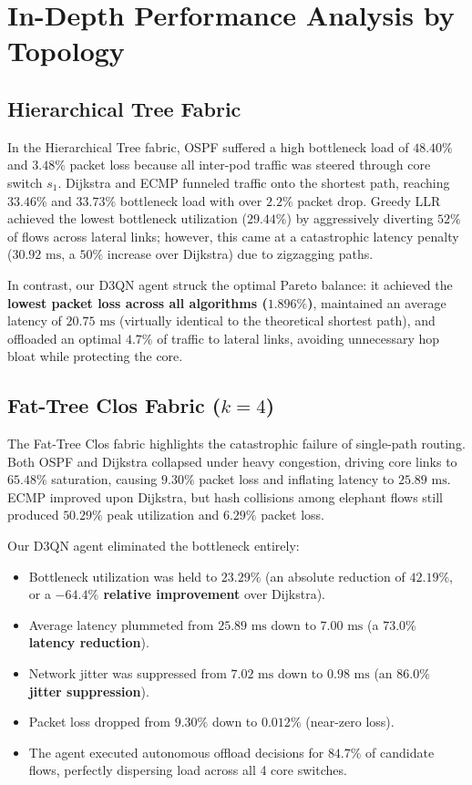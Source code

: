 \documentclass[12pt,a4paper,oneside]{report}
\begin{document}
\section{In-Depth Performance Analysis by Topology}

\subsection{Hierarchical Tree Fabric}
In the Hierarchical Tree fabric, OSPF suffered a high bottleneck load of $48.40\%$ and $3.48\%$ packet loss because all inter-pod traffic was steered through core switch $s_1$. Dijkstra and ECMP funneled traffic onto the shortest path, reaching $33.46\%$ and $33.73\%$ bottleneck load with over $2.2\%$ packet drop. Greedy LLR achieved the lowest bottleneck utilization ($29.44\%$) by aggressively diverting $52\%$ of flows across lateral links; however, this came at a catastrophic latency penalty ($30.92\text{ ms}$, a $50\%$ increase over Dijkstra) due to zigzagging paths.

In contrast, our D3QN agent struck the optimal Pareto balance: it achieved the \textbf{lowest packet loss across all algorithms ($1.896\%$)}, maintained an average latency of \textbf{$20.75\text{ ms}$} (virtually identical to the theoretical shortest path), and offloaded an optimal $4.7\%$ of traffic to lateral links, avoiding unnecessary hop bloat while protecting the core.

\subsection{Fat-Tree Clos Fabric ($k=4$)}
The Fat-Tree Clos fabric highlights the catastrophic failure of single-path routing. Both OSPF and Dijkstra collapsed under heavy congestion, driving core links to $65.48\%$ saturation, causing $9.30\%$ packet loss and inflating latency to $25.89\text{ ms}$. ECMP improved upon Dijkstra, but hash collisions among elephant flows still produced $50.29\%$ peak utilization and $6.29\%$ packet loss.

Our D3QN agent eliminated the bottleneck entirely:
\begin{itemize}
    \item Bottleneck utilization was held to \textbf{$23.29\%$} (an absolute reduction of \textbf{$42.19\%$}, or a \textbf{$-64.4\%$ relative improvement} over Dijkstra).
    \item Average latency plummeted from $25.89\text{ ms}$ down to \textbf{$7.00\text{ ms}$} (a \textbf{$73.0\%$ latency reduction}).
    \item Network jitter was suppressed from $7.02\text{ ms}$ down to \textbf{$0.98\text{ ms}$} (an \textbf{$86.0\%$ jitter suppression}).
    \item Packet loss dropped from $9.30\%$ down to \textbf{$0.012\%$} (near-zero loss).
    \item The agent executed autonomous offload decisions for \textbf{$84.7\%$} of candidate flows, perfectly dispersing load across all 4 core switches.
\end{itemize}
\end{document}
